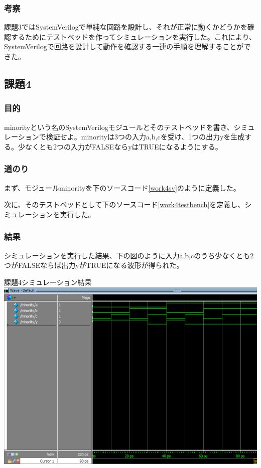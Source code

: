 \documentclass[a4paper]{jarticle}
\begin{document}
\subsubsection{考察}
課題3ではSystemVerilogで単純な回路を設計し、それが正常に動くかどうかを確認するためにテストベッドを作ってシミュレーションを実行した。これにより、SystemVerilogで回路を設計して動作を確認する一連の手順を理解することができた。
\subsection{課題4}
\subsubsection{目的}
minorityという名のSystemVerilogモジュールとそのテストベッドを書き、シミュレーションで検証せよ。minorityは3つの入力a,b,cを受け、1つの出力yを生成する。少なくとも2つの入力がFALSEならyはTRUEになるようにする。
\subsubsection{道のり}
まず、モジュールminorityを下のソースコード\ref{work4sv}のように定義した。

次に、そのテストベッドとして下のソースコード\ref{work4testbench}を定義し、シミュレーションを実行した。

\subsubsection{結果}
シミュレーションを実行した結果、下の図のように入力a,b,cのうち少なくとも2つがFALSEならば出力yがTRUEになる波形が得られた。
\begin{center}
	課題4シミュレーション結果
	\includegraphics[width=15cm]{4-m.PNG}
\end{center}
\end{document}
